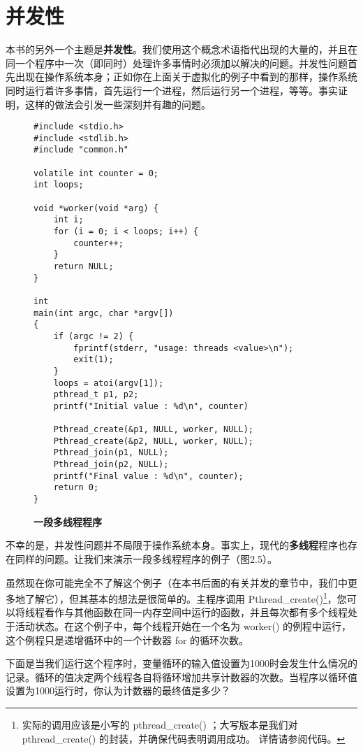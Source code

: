 \section{并发性}
本书的另外一个主题是\textbf{并发性}。我们使用这个概念术语指代出现的大量的，并且在同一个程序中一次（即同时）处理许多事情时必须加以解决的问题。并发性问题首先出现在操作系统本身；正如你在上面关于虚拟化的例子中看到的那样，操作系统同时运行着许多事情，首先运行一个进程，然后运行另一个进程，等等。事实证明，这样的做法会引发一些深刻并有趣的问题。

\begin{figure}[ht]
\begin{lstlisting}
#include <stdio.h>
#include <stdlib.h>
#include "common.h"

volatile int counter = 0;
int loops;

void *worker(void *arg) {
    int i;
    for (i = 0; i < loops; i++) {
        counter++;
    }
    return NULL;
}

int
main(int argc, char *argv[])
{
    if (argc != 2) {
        fprintf(stderr, "usage: threads <value>\n");
        exit(1);
    }
    loops = atoi(argv[1]);
    pthread_t p1, p2;
    printf("Initial value : %d\n", counter)
    
    Pthread_create(&p1, NULL, worker, NULL);
    Pthread_create(&p2, NULL, worker, NULL);
    Pthread_join(p1, NULL);
    Pthread_join(p2, NULL);
    printf("Final value : %d\n", counter);
    return 0;
}

\end{lstlisting}
\caption{\textbf{一段多线程程序}}
\end{figure}

不幸的是，并发性问题并不局限于操作系统本身。事实上，现代的\textbf{多线程}程序也存在同样的问题。让我们来演示一段多线程程序的例子（图2.5）。

虽然现在你可能完全不了解这个例子（在本书后面的有关并发的章节中，我们中更多地了解它），但其基本的想法是很简单的。主程序调用 Pthread\_create()\footnote{实际的调用应该是小写的 pthread\_create() ；大写版本是我们对 pthread\_create() 的封装，并确保代码表明调用成功。 详情请参阅代码。}，您可以将线程看作与其他函数在同一内存空间中运行的函数，并且每次都有多个线程处于活动状态。在这个例子中，每个线程开始在一个名为 worker() 的例程中运行，这个例程只是递增循环中的一个计数器 for 的循环次数。

下面是当我们运行这个程序时，变量循环的输入值设置为1000时会发生什么情况的记录。循环的值决定两个线程各自将循环增加共享计数器的次数。当程序以循环值设置为1000运行时，你认为计数器的最终值是多少？

